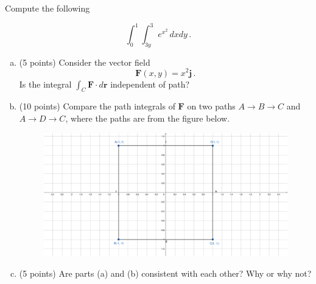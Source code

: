 \documentclass[12pt]{article}
\newcommand{\vect}{\mathbf}
\begin{document}
\begin{problem}[16 points]
    Compute the following

            $$\int_0^1 \int_{3y}^3 e^{x^2} \, dx dy \,.$$

\end{problem}

\newpage
\begin{problem}
    \begin{enumerate}[(a)]
        \item (5 points) Consider the vector field
            \begin{equation*}
                \vect{F}(x,y) = x^2 \vect{j} \,.
            \end{equation*}
            Is the integral $\int_C \vect{F} \cdot d\vect{r}$ independent of path?

        \item (10 points)
            Compare
            the path integrals of $\vect{F}$ on two paths $A\to B \to C$ and $A\to D \to C$,
            where the paths are from the figure below.
            \begin{figure}[!h]
            \includegraphics[width=1.5\textwidth]{paths.pdf}
            \end{figure}
    \item (5 points) Are parts (a) and (b) consistent with each other? Why or why not?
    \end{enumerate}

\end{problem}
\end{document}
